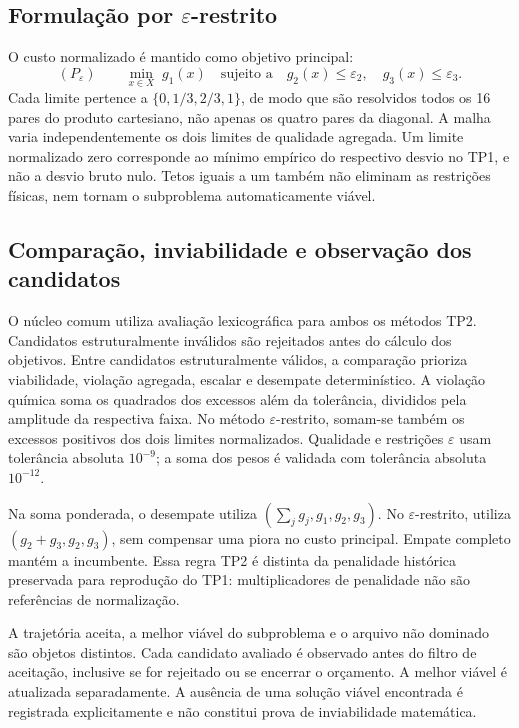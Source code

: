 \documentclass[12pt,a4paper]{article}
\begin{document}
\subsection{Formulação por $\varepsilon$-restrito}

O custo normalizado é mantido como objetivo principal:
\begin{equation}
 (P_{\varepsilon})\qquad
 \min_{x\in X}\;g_1(x)\quad
 \text{sujeito a}\quad g_2(x)\leq\varepsilon_2,\quad
 g_3(x)\leq\varepsilon_3.
\end{equation}
Cada limite pertence a $\{0,1/3,2/3,1\}$, de modo que são resolvidos todos
os 16 pares do produto cartesiano, não apenas os quatro pares da diagonal.
A malha varia independentemente os dois limites de qualidade agregada.
Um limite normalizado zero corresponde ao mínimo empírico do respectivo
desvio no TP1, e não a desvio bruto nulo. Tetos iguais a um também não
eliminam as restrições físicas, nem tornam o subproblema automaticamente viável.

\subsection{Comparação, inviabilidade e observação dos candidatos}

O núcleo comum utiliza avaliação lexicográfica para ambos os métodos TP2.
Candidatos estruturalmente inválidos são rejeitados antes do cálculo dos
objetivos. Entre candidatos estruturalmente válidos, a comparação prioriza
viabilidade, violação agregada, escalar e desempate determinístico.
A violação química soma os quadrados dos excessos além da tolerância,
divididos pela amplitude da respectiva faixa. No método $\varepsilon$-restrito,
somam-se também os excessos positivos dos dois limites normalizados.
Qualidade e restrições $\varepsilon$ usam tolerância absoluta $10^{-9}$;
a soma dos pesos é validada com tolerância absoluta $10^{-12}$.

Na soma ponderada, o desempate utiliza $(\sum_jg_j,g_1,g_2,g_3)$.
No $\varepsilon$-restrito, utiliza $(g_2+g_3,g_2,g_3)$, sem compensar
uma piora no custo principal. Empate completo mantém a incumbente.
Essa regra TP2 é distinta da penalidade histórica preservada para reprodução
do TP1: multiplicadores de penalidade não são referências de normalização.

A trajetória aceita, a melhor viável do subproblema e o arquivo não dominado
são objetos distintos. Cada candidato avaliado é observado antes do filtro
de aceitação, inclusive se for rejeitado ou se encerrar o orçamento. A melhor
viável é atualizada separadamente. A ausência de uma solução viável encontrada
é registrada explicitamente e não constitui prova de inviabilidade matemática.
\end{document}
